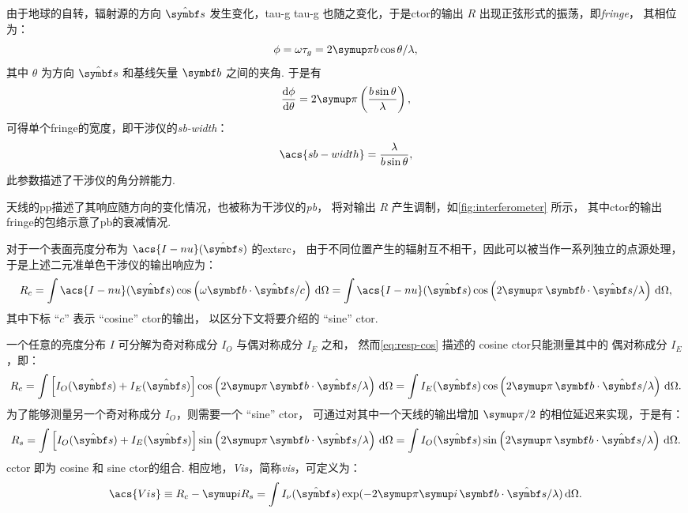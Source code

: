 由于地球的自转，辐射源的方向 $\hat{\B{s}}$ 发生变化，\acl{tau-g} \acs{tau-g}
也随之变化，于是\acl{ctor}的输出 $R$ 出现正弦形式的振荡，即\emph{\acf{fringe}}，
其相位为：
\begin{equation}
  \phi = \omega\tau_g = 2\Cpi b \cos\theta / \lambda,
\end{equation}
其中 $\theta$ 为方向 $\hat{\B{s}}$ 和基线矢量 $\B{b}$ 之间的夹角.
于是有
\begin{equation}
  \diff{\phi}{\theta} = 2\Cpi \left( \frac{b \sin\theta}{\lambda} \right),
\end{equation}
可得单个\acl{fringe}的宽度，即干涉仪的\emph{\acf{sb-width}}：
\begin{equation}
  \label{eq:sb-width}
  \acs{sb-width} = \frac{\lambda}{b \sin\theta},
\end{equation}
此参数描述了干涉仪的角分辨能力.

天线的\acl{pp}描述了其响应随方向的变化情况，也被称为干涉仪的\emph{\acf{pb}}，
将对输出 $R$ 产生调制，如\autoref{fig:interferometer} 所示，
其中\acl{ctor}的输出\acl{fringe}的包络示意了\acl{pb}的衰减情况.

对于一个表面亮度分布为 $\acs{I-nu}(\hat{\B{s}})$ 的\acl{extsrc}，
由于不同位置产生的辐射互不相干，因此可以被当作一系列独立的点源处理，
于是上述二元准单色干涉仪的输出响应为：
\begin{equation}
  \label{eq:resp-cos}
  R_c = \int \acs{I-nu}(\hat{\B{s}}) \cos \left(
      \omega \B{b}\cdot\hat{\B{s}} / c \right) \D{\Omega}
    = \int \acs{I-nu}(\hat{\B{s}}) \cos \left(
      2\Cpi\, \B{b}\cdot\hat{\B{s}} / \lambda \right) \D{\Omega},
\end{equation}
其中下标 \enquote{$c$} 表示 \enquote{cosine} \acl{ctor}的输出，
以区分下文将要介绍的 \enquote{sine} \acl{ctor}.

一个任意的亮度分布 $I$ 可分解为奇对称成分 $I_O$ 与偶对称成分 $I_E$ 之和，
然而\autoref{eq:resp-cos} 描述的 cosine \acl{ctor}只能测量其中的
偶对称成分 $I_E$，即：
\begin{equation}
  R_c = \int \left[ I_O(\hat{\B{s}}) + I_E(\hat{\B{s}}) \right]
      \cos \left( 2\Cpi\, \B{b}\cdot\hat{\B{s}} / \lambda \right)
      \D{\Omega}
    = \int I_E(\hat{\B{s}}) \cos \left(
      2\Cpi\, \B{b}\cdot\hat{\B{s}} / \lambda \right) \D{\Omega}.
\end{equation}
为了能够测量另一个奇对称成分 $I_O$，则需要一个 \enquote{sine} \acl{ctor}，
可通过对其中一个天线的输出增加 $\Cpi/2$ 的相位延迟来实现，于是有：
\begin{equation}
  R_s = \int \left[ I_O(\hat{\B{s}}) + I_E(\hat{\B{s}}) \right]
      \sin \left( 2\Cpi\, \B{b}\cdot\hat{\B{s}} / \lambda \right)
      \D{\Omega}
    = \int I_O(\hat{\B{s}}) \sin \left(
      2\Cpi\, \B{b}\cdot\hat{\B{s}} / \lambda \right) \D{\Omega}.
\end{equation}
\ac{cctor} 即为 cosine 和 sine \acl{ctor}的组合.
相应地，\emph{\acf{Vis}}，简称\emph{\acl{vis}}，可定义为：
\begin{equation}
  \label{eq:vis}
  \acs{Vis} \equiv R_c - \Ci R_s
    = \int I_{\nu}(\hat{\B{s}}) \exp
      (-2\Cpi\Ci\, \B{b}\cdot\hat{\B{s}} / \lambda) \D{\Omega}.
\end{equation}

